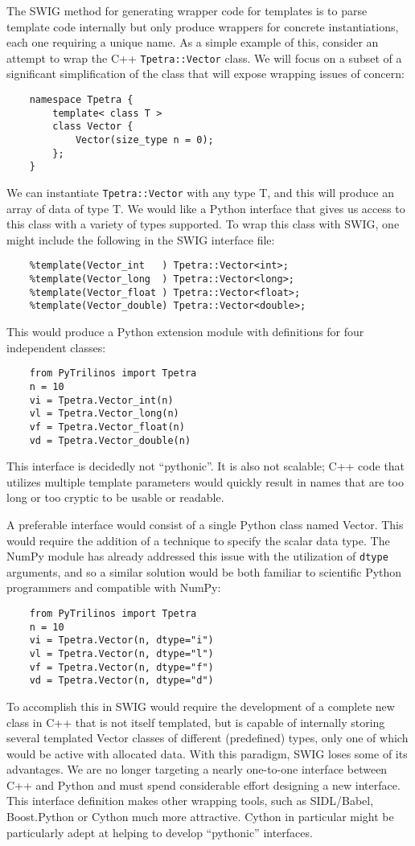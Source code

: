 \documentclass[11pt]{article}
\begin{document}
The SWIG method for generating wrapper code for templates is to parse template code internally but only produce wrappers for concrete instantiations, each one requiring a unique name.  As a simple example of this, consider an attempt to wrap the C++ {\tt Tpetra::Vector} class.  We will focus on a subset of a significant simplification of the class that will expose wrapping issues of concern:
\begin{verbatim}
    namespace Tpetra {
        template< class T >
        class Vector {
            Vector(size_type n = 0);
        };
    }
\end{verbatim}
We can instantiate {\tt Tpetra::Vector} with any type T, and this will produce an array of data of type T.  We would like a Python interface that gives us access to this class with a variety of types supported.  To wrap this class with SWIG, one might include the following in the SWIG interface file:
\begin{verbatim}
    %template(Vector_int   ) Tpetra::Vector<int>;
    %template(Vector_long  ) Tpetra::Vector<long>;
    %template(Vector_float ) Tpetra::Vector<float>;
    %template(Vector_double) Tpetra::Vector<double>;
\end{verbatim}
This would produce a Python extension module with definitions for four independent classes:
\begin{verbatim}
    from PyTrilinos import Tpetra
    n = 10
    vi = Tpetra.Vector_int(n)
    vl = Tpetra.Vector_long(n)
    vf = Tpetra.Vector_float(n)
    vd = Tpetra.Vector_double(n)
\end{verbatim}
This interface is decidedly not ``pythonic''.  It is also not scalable; C++ code that utilizes multiple template parameters would quickly result in names that are too long or too cryptic to be usable or readable.

A preferable interface would consist of a single Python class named Vector.  This would require the addition of a technique to specify the scalar data type.  The NumPy module has already addressed this issue with the utilization of {\tt dtype} arguments, and so a similar solution would be both familiar to scientific Python programmers and compatible with NumPy:
\begin{verbatim}
    from PyTrilinos import Tpetra
    n = 10
    vi = Tpetra.Vector(n, dtype="i")
    vl = Tpetra.Vector(n, dtype="l")
    vf = Tpetra.Vector(n, dtype="f")
    vd = Tpetra.Vector(n, dtype="d")
\end{verbatim}
To accomplish this in SWIG would require the development of a complete new class in C++ that is not itself templated, but is capable of internally storing several templated Vector classes of different (predefined) types, only one of which would be active with allocated data.  With this paradigm, SWIG loses some of its advantages.  We are no longer targeting a nearly one-to-one interface between C++ and Python and must spend considerable effort designing a new interface.  This interface definition makes other wrapping tools, such as SIDL/Babel, Boost.Python or Cython much more attractive.  Cython in particular might be particularly adept at helping to develop ``pythonic'' interfaces.
\end{document}
